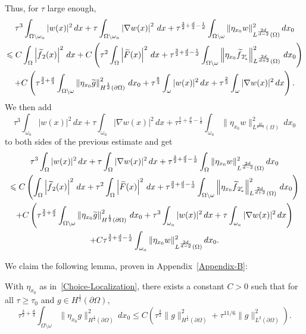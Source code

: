 \documentclass[AHL,Unicode,longabstracts]{cedram}
\newcommand{\norm}[1]{\left\Vert#1\right\Vert}
\renewcommand{\leq}{\leqslant}
\renewcommand{\geq}{\geqslant}
\renewcommand{\tilde}{\widetilde}
\let\oldtilde\tilde
\renewcommand*{\tilde}[1]{\mathchoice{\widetilde{#1}}{\widetilde{#1}}{\oldtilde{#1}}{\oldtilde{#1}}}
\begin{document}
Thus, for $\tau$ large enough,
\begin{multline*}
\tau^3 \int_{\Omega\setminus\omega_a} |w(x)|^2 \, dx +
\tau \int_{\Omega \setminus \omega_a} \left|\nabla w(x)\right|^2 \, dx +
\tau^{\frac{3}{2}+\frac{d}{3}-\frac{1}{d}} \int_{\Omega \setminus \omega} \| \eta_{x_0} w \|_{L^{\frac{2d}{d-2}}(\Omega)}^2 \, dx_0
\\
\leq C \int_\Omega \left|\tilde f_2(x)\right|^2\, dx + C \left(
\tau^2 \int_\Omega \left|\tilde F(x)\right|^2\, dx + \tau^{\frac{3}{2}+\frac{d}{3}-\frac{1}{d}} \int_{\Omega \setminus \omega} \norm{\eta_{x_0} \tilde f_{2_*'}}_{L^{\frac{2d}{d+2}}(\Omega)}^2 \, dx_0
\right)
\\
+ C
\left(
\tau^{\frac{3}{2}+\frac{d}{3}} \int_{\Omega \setminus \omega} \norm{\eta_{x_0} \tilde g }_{H^{\frac{1}{2}}(\partial \Omega)}^2 \, dx_0 + \tau^{\frac{8}{3}} \int_\omega |w(x)|^2 \, dx +
\tau^{\frac{2}{3}} \int_\omega |\nabla w(x)|^2 \, dx
\right).
\end{multline*}
We then add
\[
\tau^3 \int_{\omega_a} |w(x)|^2 \, dx +
\tau \int_{ \omega_a} |\nabla w(x)|^2 \, dx +
\tau^{\frac{3}{2}+\frac{d}{3}-\frac{1}{d}} \int_{ \omega_a} \| \eta_{x_0} w \|_{L^{\frac{2d}{d-2}}(\Omega)}^2 \, dx_0
\]
to both sides of the previous estimate and get
\begin{multline}\label{Carleman-A-Nettoyer}
\tau^3 \int_{\Omega} |w(x)|^2 \, dx +
\tau \int_{\Omega} |\nabla w(x)|^2 \, dx +
\tau^{\frac{3}{2}+\frac{d}{3}-\frac{1}{d}} \int_{\Omega} \| \eta_{x_0} w \|_{L^{\frac{2d}{d-2}}(\Omega)}^2 \, dx_0 \\
\leq C
\left(\int_\Omega \left|\tilde f_2(x)\right|^2\, dx +\tau^2 \int_\Omega \left|\tilde F(x)\right|^2\, dx +
\tau^{\frac{3}{2}+\frac{d}{3}-\frac{1}{d}} \int_{\Omega \setminus \omega} \left\| \eta_{x_0} \tilde f_{2_*'} \right\|_{L^{\frac{2d}{d+2}}(\Omega)}^2 \, dx_0
\right)
\\
+ C
\left(
\tau^{\frac{3}{2}+\frac{d}{3}} \int_{\Omega \setminus \omega} \left\| \eta_{x_0} \tilde g \right\|_{H^{\frac{1}{2}}(\partial \Omega)}^2 \, dx_0+
\tau^{3} \int_{\omega_a} |w(x)|^2 \, dx +
\tau \int_{\omega_a} |\nabla w(x)|^2 \, dx
\right)
\\
+C
\tau^{\frac{3}{2}+\frac{d}{3}-\frac{1}{d}} \int_{\omega_a} \| \eta_{x_0} w \|_{L^{\frac{2d}{d-2}}(\Omega)}^2 \, dx_0.
\end{multline}

We claim the following lemma, proven in Appendix~\ref{Appendix-B}:

\begin{lemm}\label{Lem-Boundary-H-1/2}
With $\eta_{x_0}$ as in~\eqref{Choice-Localization}, there exists a constant $C>0$ such that for all $\tau \geq \tau_0$ and $g \in H^{\frac{1}{2}}(\partial \Omega)$,
\begin{equation}\label{Boundary-H-1/2-norms}
\tau^{\frac{3}{2}+\frac{d}{3}} \int_{\Omega \setminus \omega} \| \eta_{x_0} g \|_{H^{\frac{1}{2}}(\partial \Omega)}^2 \, dx_0
\leq C \left(
\tau^{\frac{3}{2}} \| g \|_{H^{\frac{1}{2}}(\partial \Omega)}^2 + \tau^{11/6} \|g\|_{L^2(\partial \Omega)}^2\right).
\end{equation}
\end{lemm}
\end{document}
